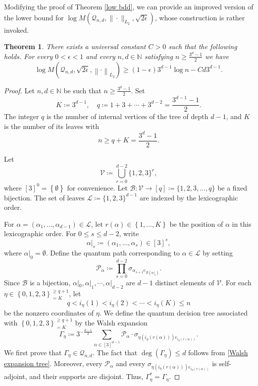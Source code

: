 \documentclass{amsbook}
\newtheorem{theorem}{Theorem}[chapter]
\theoremstyle{definition}
\theoremstyle{remark}
\numberwithin{section}{chapter}
\numberwithin{equation}{chapter}
\newcommand{\1}{\mathbf{1}}
\begin{document}
Modifying the proof of Theorem \ref{low bdd}, we can provide an improved version of the lower bound for $\log M(\mathcal{Q}_{n,d},\|\cdot\|_{L_{2}},\sqrt{2\epsilon})$, whose construction is rather invoked.
\begin{theorem}\label{quantum packing}
There exists a universal constant $C>0$ such that the following holds. For every $0<\epsilon<1$ and every $n,d\in\mathbb{N}$ satisfying $n\geq\frac{3^{d}-1}{2}$ we have
\[
\log M\left(\mathcal{Q}_{n,d},\sqrt{2\epsilon},\left\|\cdot\right\|_{L_{2}}\right)\geq(1-\epsilon)3^{d-1}\log n-Cd3^{d-1}.
\]
\end{theorem}
\begin{proof}
Let  $n,d\in\mathbb{N}$ be such that $n\geq\frac{3^{d}-1}{2}$. Set
\[
K\coloneqq3^{d-1},\quad q\coloneqq1+3+\cdots+3^{d-2}=\frac{3^{d-1}-1}{2}.
\]
The integer $q$ is the number of internal vertices of the tree of depth $d-1$, and $K$ is the number of its leaves with
\[
n\geq q+K=\frac{3^{d}-1}{2}.
\]

Let
\[
\mathcal{V}\coloneqq\bigcup_{r=0}^{d-2}\{1,2,3\}^{r},
\]
where $[3]^{0}=\left\{\emptyset\right\}$ for convenience. Let $\mathcal{B}: \mathcal{V}\to[q]\coloneqq \{1,2,3,\dots, q\}$ be a fixed bijection. The set of leaves $\mathcal{L}\coloneqq \{1,2,3\}^{d-1}$ are indexed by the lexicographic order.


For $\alpha=(\alpha_{1},\dots,\alpha_{d-1})\in\mathcal{L}$, let $r(\alpha)\in\left\{1,\dots,K\right\}$ be the position of $\alpha$ in this lexicographic order.
For $0\leq s\leq d-2$, write
\[
\alpha|_{s}\coloneqq(\alpha_{1},\dots,\alpha_{s})\in[3]^{s},
\]
where $\alpha|_{0}=\emptyset$. Define the quantum path corresponding to $\alpha\in \mathcal{L}$ by setting
\[
\mathcal{P}_{\alpha}\coloneqq\prod_{s=0}^{d-2}\sigma_{\alpha_{s+1}e_{\mathcal{B}(\alpha|_{s})}}.
\]
Since \(\mathcal{B}\) is a bijection,  \(\alpha|_{0},\alpha|_{1},\cdots,\alpha|_{d-2}\)  are \(d-1\) distinct elements of \(\mathcal{V}\).
For each $\eta\in\left\{0,1,2,3\right\}^{\geq q+1}_{=K}$, let
\[
q<i_{\eta}(1)<i_{\eta}(2)<\cdots<i_{\eta}(K)\leq n
\]
be the nonzero coordinates of $\eta$.
We define the quantum decision tree associated with $\left\{0,1,2,3\right\}^{\geq q+1}_{=K}$ by the Walsh expansion
\begin{equation}\label{Walsh expansion tree}
\Gamma_{\eta}\coloneqq3^{-\frac{d-1}{2}}\sum_{\alpha\in[3]^{d-1}}\mathcal{P}_{\alpha}\cdot \sigma_{\eta(i_{\eta}(r(\alpha)))e_{i_{\eta}(r(\alpha))}}.
\end{equation}
We first prove that $\Gamma_{\eta}\in\mathcal{Q}_{n,d}$. The fact that $\deg(\Gamma_{\eta})\leq d$ follows from \eqref{Walsh expansion tree}. Moreover, every $\mathcal{P}_{\alpha}$ and every $\sigma_{\eta(i_{\eta}(r(\alpha)))e_{i_{\eta}(r(\alpha))}}$ is self-adjoint, and their supports are disjoint. Thus, $\Gamma^{*}_{\eta}=\Gamma_{\eta}$.


\end{proof}
\end{document}
